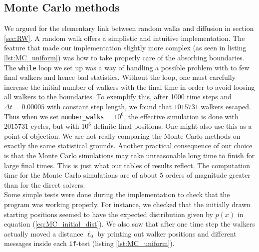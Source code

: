 \documentclass[a4paper, 11pt, notitlepage,english]{article}
\begin{document}
\subsection{Monte Carlo methods}
We argued for the elementary link between random walks and diffusion in section \ref{sec:RW}. A random walk offers a simplistic and intuitive implementation. The feature that made our implementation slightly more complex (as seen in listing \ref{lst:MC_uniform}) was how to take properly care of the absorbing boundaries. The \texttt{while} loop we set up was a way of handling a possible problem with to few final walkers and hence bad statistics. Without the loop, one must carefully increase the initial number of walkers with the final time in order to avoid loosing all walkers to the boundaries. To exemplify this, after 1000 time steps and $\Delta t = 0.00005$ with constant step length, we found that $1 015 731$ walkers escaped. Thus when we set \texttt{number\_walks} = $10^6$, the effective simulation is done with $2 015 731$ cycles, but with $10^6$ definite final positions. One might also use this as a point of objection. We are not really comparing the Monte Carlo methods on exactly the same statistical grounds. Another practical consequence of our choice is that the Monte Carlo simulations may take unreasonable long time to finish for large final times. This is just what our tables of results reflect. The computation time for the Monte Carlo simulations are of about 5 orders of magnitude greater than for the direct solvers. \\

Some simple tests were done during the implementation to check that the program was working properly. For instance, we checked that the initially drawn starting positions seemed to have the expected distribution given by $p(x)$ in equation (\ref{eq:MC_initial_dist}). We also saw that after one time step the walkers actually moved a distance $\ell_0$ by printing out walker positions and different messages inside each \texttt{if}-test (listing \ref{lst:MC_uniform}). \\
\end{document}
